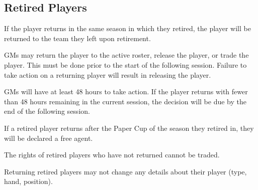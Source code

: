 \subsection{Retired Players}
\begin{deepEnumerate}
	\item If the player returns in the same season in which they retired, the player will be returned to the team they left upon retirement.
	\begin{deepEnumerate}
		\item GMs may return the player to the active roster, release the player, or trade the player. This must be done prior to the start of the
		following session. Failure to take action on a returning player will result in releasing the player.
		\begin{deepEnumerate}
			\item GMs will have at least 48 hours to take action. If the player returns with fewer than 48 hours remaining in the current session,
			the decision will be due by the end of the following session.
		\end{deepEnumerate}
	\end{deepEnumerate}
	\item If a retired player returns after the Paper Cup of the season they retired in, they will be declared a free agent.
	\item The rights of retired players who have not returned cannot be traded.
	\item Returning retired players may not change any details about their player (type, hand, position).
\end{deepEnumerate}

